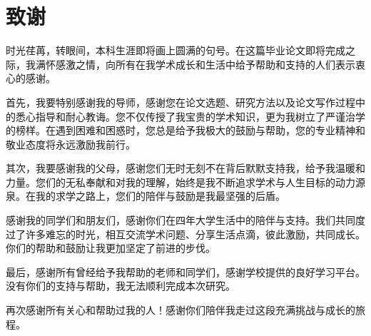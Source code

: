 {}
\section*{致谢}

时光荏苒，转眼间，本科生涯即将画上圆满的句号。在这篇毕业论文即将完成之际，我满怀感激之情，向所有在我学术成长和生活中给予帮助和支持的人们表示衷心的感谢。

首先，我要特别感谢我的导师，感谢您在论文选题、研究方法以及论文写作过程中的悉心指导和耐心教诲。您不仅传授了我宝贵的学术知识，更为我树立了严谨治学的榜样。在遇到困难和困惑时，您总是给予我极大的鼓励与帮助，您的专业精神和敬业态度将永远激励我前行。

其次，我要感谢我的父母，感谢您们无时无刻不在背后默默支持我，给予我温暖和力量。您们的无私奉献和对我的理解，始终是我不断追求学术与人生目标的动力源泉。在我的求学之路上，您们的陪伴与鼓励是我最坚强的后盾。

感谢我的同学们和朋友们，感谢你们在四年大学生活中的陪伴与支持。我们共同度过了许多难忘的时光，相互交流学术问题、分享生活点滴，彼此激励，共同成长。你们的帮助和鼓励让我更加坚定了前进的步伐。

最后，感谢所有曾经给予我帮助的老师和同学们，感谢学校提供的良好学习平台。没有你们的支持与帮助，我无法顺利完成本次研究。

再次感谢所有关心和帮助过我的人！感谢你们陪伴我走过这段充满挑战与成长的旅程。
